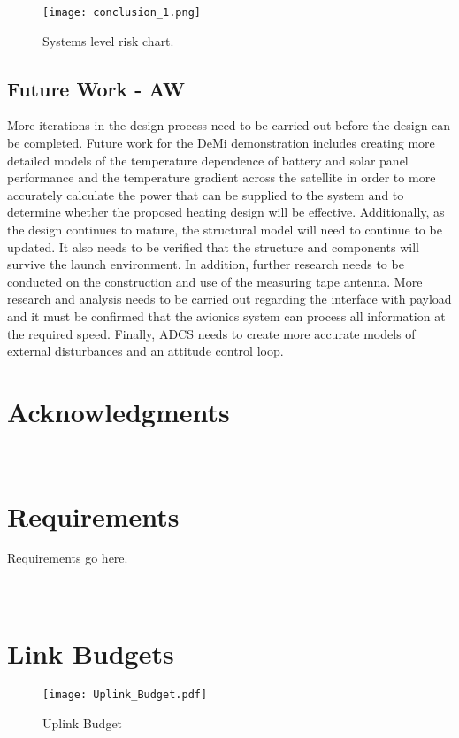 \documentclass[12pt]{article}
\begin{document}
\begin{figure}[h]
\centering
\texttt{[image: conclusion\_1.png]}
\caption{Systems level risk chart.}
\label{fig:risk_chart}
\end{figure}

		\subsection{Future Work - AW}

More iterations in the design process need to be carried out before the design can be completed.  Future work for the DeMi demonstration includes creating more detailed models of the temperature dependence of battery and solar panel performance and the temperature gradient across the satellite in order to more accurately calculate the power that can be supplied to the system and to determine whether the proposed heating design will be effective.  Additionally, as the design continues to mature, the structural model will need to continue to be updated.  It also needs to be verified that the structure and components will survive the launch environment. In addition, further research needs to be conducted on the construction and use of the measuring tape antenna.  More research and analysis needs to be carried out regarding the interface with payload and it must be confirmed that the avionics system can process all information at the required speed.  Finally, ADCS needs to create more accurate models of external disturbances and an attitude control loop.

\section{Acknowledgments}
	
	

\newpage
\appendix
\section{\\Requirements} \label{app:requirements}
Requirements go here.

\newpage
\section{\\Link Budgets} \label{app:link_budgets}

\begin{figure}[ht]
\centering 
\caption{Uplink Budget}
\texttt{[image: Uplink\_Budget.pdf]}
\end{figure}
\end{document}
